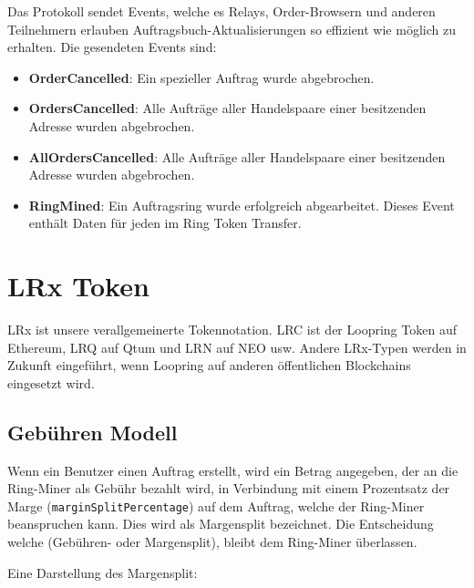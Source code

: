 \documentclass[UTF8,nofonts]{article}
\makeatletter
\newenvironment{figurehere}
 {\def\@captype{figure}}
 {}
\makeatother
\begin{document}
\begin{multicols}{2}
Das Protokoll sendet Events, welche es Relays, Order-Browsern und anderen Teilnehmern erlauben Auftragsbuch-Aktualisierungen so effizient wie möglich zu erhalten. Die gesendeten Events sind:

\begin{itemize}
	\item \textbf{OrderCancelled}: Ein spezieller Auftrag wurde abgebrochen.
	\item \textbf{OrdersCancelled}: Alle Aufträge aller Handelspaare einer besitzenden Adresse wurden abgebrochen.
	\item \textbf{AllOrdersCancelled}: Alle Aufträge aller Handelspaare einer besitzenden Adresse wurden abgebrochen.
	\item \textbf{RingMined}: Ein Auftragsring wurde erfolgreich abgearbeitet. Dieses Event enthält Daten für jeden im Ring Token Transfer.
\end{itemize}


\section{LRx Token\label{sec:token}}
LRx ist unsere verallgemeinerte Tokennotation. LRC ist der Loopring Token auf Ethereum, LRQ auf Qtum und LRN auf NEO usw. Andere LRx-Typen werden in Zukunft eingeführt, wenn Loopring auf anderen öffentlichen Blockchains eingesetzt wird.

\subsection{Gebühren Modell\label{sec:fee_model}} 
Wenn ein Benutzer einen Auftrag erstellt, wird ein Betrag angegeben, der an die Ring-Miner als Gebühr bezahlt wird, in Verbindung mit einem Prozentsatz der Marge (\verb|marginSplitPercentage|) auf dem Auftrag, welche der Ring-Miner beanspruchen kann. Dies wird als Margensplit bezeichnet. Die Entscheidung welche (Gebühren- oder Margensplit), bleibt dem Ring-Miner überlassen.

Eine Darstellung des Margensplit: 

\begin{center}
\begin{figurehere}
\centering
{}
\end{figurehere}
\end{center}
\end{multicols}
\end{document}
